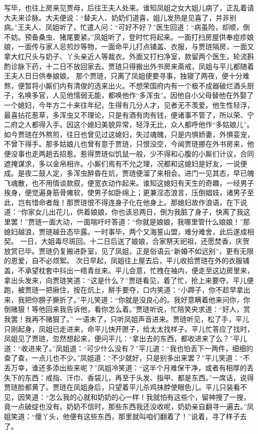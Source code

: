\documentclass[12pt,oneside]{book}
\begin{document}
写毕，也往上房来见贾母，后往王夫人处来。谁知凤姐之女大姐儿病了，正乱着请大夫来诊脉。大夫便说：“替夫人、奶奶们道喜，姐儿发热是见喜了，并非别病。”王夫人、凤姐听了，忙遣人问：“可好不好？”医生回道：“病虽险，却顺，倒不妨。预备桑虫、猪尾要紧。”凤姐听了，登时忙将起来。一面打扫房屋供奉痘疹娘娘，一面传与家人忌煎炒等物，一面命平儿打点铺盖、衣服，与贾琏隔房，一面又拿大红尺头与奶子、丫头亲近人等裁衣。外面又打扫净室，款留两个医生，轮流斟酌诊脉下药，十二日不放回家去。贾琏只得搬出外书房来斋戒，凤姐与平儿都随着王夫人日日供奉娘娘。
那个贾琏，只离了凤姐便要寻事，独寝了两夜，便十分难熬，便暂将小厮们内有清俊的选来出火。不想荣国府内有一个极不成器破烂酒头厨子，名唤多官，人见他懦弱无能，都唤他作“多浑虫”。因他自小父母替他在外娶了一个媳妇，今年方二十来往年纪，生得有几分人才，见者无不羡爱。他生性轻浮，最喜拈花惹草，多浑虫又不理论，只是有酒有肉有钱，便诸事不管了，所以荣、宁二府之人都得入手。因这个媳妇美貌异常，轻浮无比，众人都呼他作“多姑娘儿”。如今贾琏在外熬煎，往日也曾见过这媳妇，失过魂魄，只是内惧娇妻，外惧娈宠，不曾下得手。那多姑娘儿也曾有意于贾琏，只恨没空，今闻贾琏挪在外书房来，他便没事也走两趟去招惹。惹得贾琏似饥鼠一般，少不得和心腹的小厮们计议，合同遮掩谋求，多以金帛相许。小厮们焉有不允之理，况都和这媳妇是好友，一说便成。是夜二鼓人定，多浑虫醉昏在炕，贾琏便溜了来相会。进门一见其态，早已魄飞魂散，也不用情谈款叙，便宽衣动作起来。谁知这媳妇有天生的奇趣，一经男子挨身，便觉遍身筋骨瘫软，使男子如卧绵上；更兼淫态浪言，压倒娼妓，诸男子至此，岂有惜命者哉！那贾琏恨不得连身子化在他身上。那媳妇故作浪语，在下说道：“你家女儿出花儿，供着娘娘，你也该忌两日，倒为我脏了身子，快离了我这里罢！”贾琏一面大动，一面喘吁吁答道：“你就是娘娘，我哪里管什么娘娘！”那媳妇越浪，贾琏越丑态毕露。一时事毕，两个又海誓山盟，难分难舍，此后遂成相契。
一日，大姐毒尽斑回。十二日后送了娘娘，合家祭天祀祖，还愿焚香，庆贺放赏已毕。贾琏仍复搬进卧室，见了凤姐，正是俗语云“新婚不如远别”，更有无限的恩爱，自不必烦絮。
次日早起，凤姐往上屋去后，平儿收拾贾琏在外的衣服铺盖，不承望枕套中抖出一绺青丝来。平儿会意，忙拽在袖内，便走至这边房里来，拿出头发来，向贾琏笑道：“这是什么？”贾琏看见，着了忙，抢上来要夺。平儿便跑，被贾琏一把揪住，按在炕上，掰手要夺，口内笑道：“小蹄子，你不趁早拿出来，我把你膀子撅折了。”平儿笑道：“你就是没良心的。我好意瞒着他来问你，你倒赌狠！等他回来我告诉他，看你怎么着。”贾琏听说，忙陪笑央求道：“好人，赏我罢！我再不赌狠了。”
一语未了，只听凤姐声音进来。贾琏听见，松了手，平儿只刚起身，凤姐已走进来，命平儿快开匣子，给太太找样子。平儿忙答应了找时，凤姐见了贾琏，忽然想起来，便问平儿：“拿出去的东西，都收进来了么？”平儿道：“收进来了。”凤姐道：“可少什么没有？”平儿道：“我也怕丢下一两件，细细的查了查，一点儿也不少。”凤姐道：“不少就好，只是别多出来罢？”平儿笑道：“不丢万幸，谁还多添出些来呢？”凤姐冷笑道：“这半个月难保干净，或者有相厚的丢失下的东西：戒指、汗巾、香袋儿，再至于头发、指甲、都是东西。”一席话，说得贾琏脸都黄了。贾琏在凤姐身后，只望着平儿杀鸡抹脖使眼色儿。平儿只装看不见，因笑道：“怎么我的心就和奶奶的心一样！我就怕有这些个，留神搜了一搜，竟一点破绽也没有。奶奶不信时，那些东西我还没收呢，奶奶亲自翻寻一遍去。”凤姐笑道：“傻丫头，他便有这些东西，那里就叫咱们翻着了！”说着，寻了样子去了。
\end{document}
